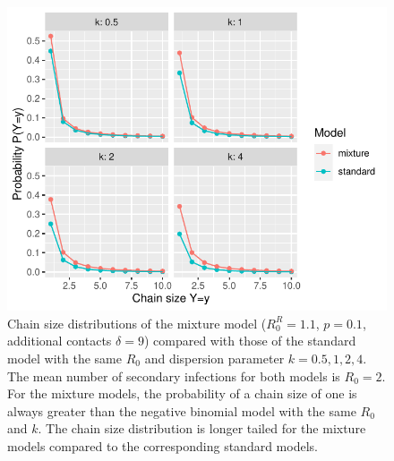 \documentclass{imammb}
\numberwithin{equation}{section}
\begin{document}

\begin{figure}
    \centering
    \includegraphics{Figure2.pdf}
    \caption{Chain size distributions of the mixture model ($R_0^R=1.1$, $p=0.1$, additional contacts $\delta =9$) compared with those of the standard model with the same $R_0$ and dispersion parameter $k=0.5, 1, 2, 4$. The mean number of secondary infections for both models is $R_0 =2$. For the mixture models, the probability of a chain size of one is always greater than the negative binomial model with the same $R_0$ and $k$.  The chain size distribution is longer tailed for the mixture models compared to the corresponding standard models. }
    \label{fig:chains}
\end{figure}
\end{document}

